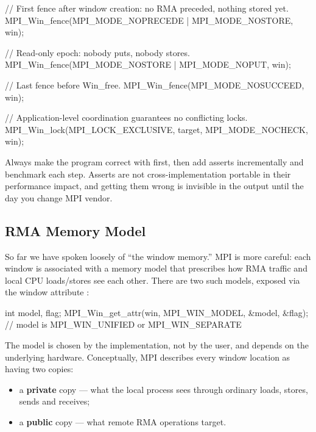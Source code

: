 \begin{exampleblock}
\begin{codeblock}[language=C]
// First fence after window creation: no RMA preceded, nothing stored yet.
MPI_Win_fence(MPI_MODE_NOPRECEDE | MPI_MODE_NOSTORE, win);

// Read-only epoch: nobody puts, nobody stores.
MPI_Win_fence(MPI_MODE_NOSTORE | MPI_MODE_NOPUT, win);

// Last fence before Win_free.
MPI_Win_fence(MPI_MODE_NOSUCCEED, win);

// Application-level coordination guarantees no conflicting locks.
MPI_Win_lock(MPI_LOCK_EXCLUSIVE, target, MPI_MODE_NOCHECK, win);
\end{codeblock}
\end{exampleblock}

\begin{tipsblock}[Develop with \plaintt{assert = 0}]
    Always make the program correct with  first, then add asserts incrementally and benchmark each step. Asserts are not cross-implementation portable in their performance impact, and getting them wrong is invisible in the output until the day you change MPI vendor.
\end{tipsblock}

\subsection{RMA Memory Model}
\label{sec:rma-memory-model}

So far we have spoken loosely of ``the window memory.'' MPI is more careful: each window is associated with a memory model that prescribes how RMA traffic and local CPU loads/stores see each other. There are two such models, exposed via the window attribute :

\begin{codeblock}[language=C]
int model, flag;
MPI_Win_get_attr(win, MPI_WIN_MODEL, &model, &flag);
// model is MPI_WIN_UNIFIED  or  MPI_WIN_SEPARATE
\end{codeblock}

The model is chosen by the implementation, not by the user, and depends on the underlying hardware. Conceptually, MPI describes every window location as having two copies:

\begin{itemize}
    \item a \textbf{private} copy --- what the local process sees through ordinary loads, stores, sends and receives;
    \item a \textbf{public} copy --- what remote RMA operations target.
\end{itemize}

